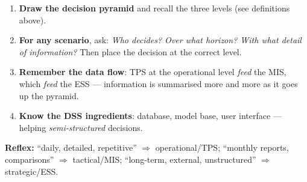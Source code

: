 \documentclass[11pt]{article}
\begin{document}
\begin{methode}
\begin{enumerate}
\item \textbf{Draw the decision pyramid} and recall the three levels (see definitions above).
\item \textbf{For any scenario}, ask: \emph{Who decides? Over what horizon? With what detail of information?} Then place the decision at the correct level.
\item \textbf{Remember the data flow}: TPS at the operational level \emph{feed} the MIS, which \emph{feed} the ESS — information is summarised more and more as it goes up the pyramid.
\item \textbf{Know the DSS ingredients}: database, model base, user interface — helping \emph{semi-structured} decisions.
\end{enumerate}
\textbf{Reflex:} ``daily, detailed, repetitive'' $\Rightarrow$ operational/TPS; ``monthly reports, comparisons'' $\Rightarrow$ tactical/MIS; ``long-term, external, unstructured'' $\Rightarrow$ strategic/ESS.
\end{methode}
\end{document}
